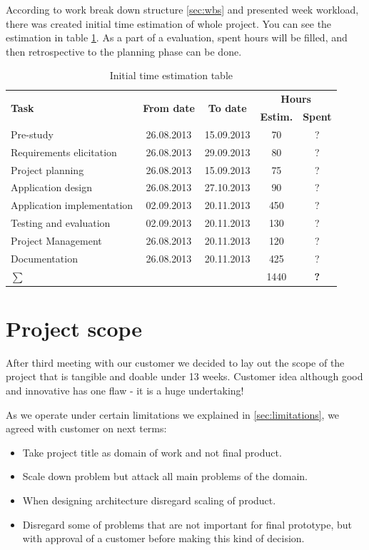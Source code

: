 According to work break down structure \ref{sec:wbs} and presented week workload, there was created initial time estimation of whole project. 
You can see the estimation in table \ref{tab:initial-time-estimation}. 
As a part of a evaluation, spent hours will be filled, and then retrospective to the planning phase can be done.

\begin{table}[!h]
	\caption{Initial time estimation table}
	\label{tab:initial-time-estimation}
	\def\arraystretch{1.25}
	\begin{tabularx}{\textwidth}{Xcccc}
		\toprule[1mm]
		\multirow{2}{*}{\textbf{Task}} &
		\multirow{2}{*}{\textbf{From date}} & 
		\multirow{2}{*}{\textbf{To date}} & 
		\multicolumn{2}{c}{\textbf{Hours}} \\
 				& & & \textbf{Estim.} & \textbf{Spent} \\
		\midrule
		Pre-study 					& 26.08.2013 & 15.09.2013 & 70 &  ?\\
		Requirements elicitation 	& 26.08.2013 & 29.09.2013 & 80 &  ?\\
		Project planning			& 26.08.2013 & 15.09.2013 &	75 &  ?\\
		Application design 			& 26.08.2013 & 27.10.2013 & 90 &  ?\\
		Application implementation	& 02.09.2013 & 20.11.2013 &	450 &  ?\\
		Testing and evaluation 		& 02.09.2013 & 20.11.2013 & 130 &	?\\
		Project Management  		& 26.08.2013 & 20.11.2013 & 120 &  ?\\
		Documentation				& 26.08.2013 & 20.11.2013 &	425 &  ?\\
		\midrule		
		\textbf{$\sum$}	& &	&		1440	& \textbf{?} \\								
		\bottomrule[1mm]
	\end{tabularx}
\end{table}


\section{Project scope}
After third meeting with our customer we decided to lay out the scope of the project that is tangible and doable under 13 weeks. Customer idea although good and innovative has one flaw - it is a huge undertaking!

As we operate under certain limitations we explained in \ref{sec:limitations}, we agreed with customer on next terms:
\begin{itemize}
	\item Take project title as domain of work and not final product.
	\item Scale down problem but attack all main problems of the domain.
	\item When designing architecture disregard scaling of product.
	\item Disregard some of problems that are not important for final prototype, but  with approval of a customer before making this kind of decision.
\end{itemize}


